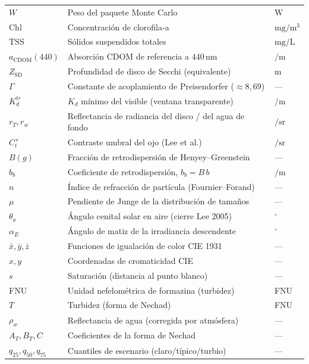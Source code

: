\documentclass[11pt,a4paper]{article}
\newcommand{\si}[1]{\ensuremath{#1}}
\newcommand{\SI}[2]{\ensuremath{#1\,#2}}
\newcommand{\watt}{\mathrm{W}}
\newcommand{\meter}{\mathrm{m}}
\newcommand{\gram}{\mathrm{g}}
\newcommand{\liter}{\mathrm{L}}
\newcommand{\steradian}{\mathrm{sr}}
\newcommand{\degree}{{}^{\circ}}
\newcommand{\per}{/}
\newcommand{\cubic}[1]{#1^{3}}
\newcommand{\milli}[1]{\mathrm{m}#1}
\newcommand{\nano}[1]{\mathrm{n}#1}
\begin{document}
\begin{longtable}{p{2.6cm}p{8.5cm}p{3cm}}
$W$ & Peso del paquete Monte Carlo & \si{\watt} \\
$\text{Chl}$ & Concentración de clorofila-a & \si{\milli\gram\per\cubic\meter} \\
$\text{TSS}$ & Sólidos suspendidos totales & \si{\milli\gram\per\liter} \\
$a_\text{CDOM}(440)$ & Absorción CDOM de referencia a \SI{440}{\nano\meter} & \si{\per\meter} \\
$Z_\text{SD}$ & Profundidad de disco de Secchi (equivalente) & \si{\meter} \\
$\Gamma$ & Constante de acoplamiento de Preisendorfer ($\approx 8{,}69$) & --- \\
$K_d^{tr}$ & $K_d$ mínimo del visible (ventana transparente) & \si{\per\meter} \\
$r_T, r_w$ & Reflectancia de radiancia del disco / del agua de fondo & \si{\per\steradian} \\
$C_t^{\,r}$ & Contraste umbral del ojo (Lee et al.) & \si{\per\steradian} \\
$B(g)$ & Fracción de retrodispersión de Henyey--Greenstein & --- \\
$b_b$ & Coeficiente de retrodispersión, $b_b=B\,b$ & \si{\per\meter} \\
$n$ & Índice de refracción de partícula (Fournier--Forand) & --- \\
$\mu$ & Pendiente de Junge de la distribución de tamaños & --- \\
$\theta_a$ & Ángulo cenital solar en aire (cierre Lee 2005) & \si{\degree} \\
$\alpha_E$ & Ángulo de matiz de la irradiancia descendente & \si{\degree} \\
$\bar x,\bar y,\bar z$ & Funciones de igualación de color CIE 1931 & --- \\
$x,y$ & Coordenadas de cromaticidad CIE & --- \\
$s$ & Saturación (distancia al punto blanco) & --- \\
FNU & Unidad nefelométrica de formazina (turbidez) & FNU \\
$T$ & Turbidez (forma de Nechad) & FNU \\
$\rho_w$ & Reflectancia de agua (corregida por atmósfera) & --- \\
$A_T, B_T, C$ & Coeficientes de la forma de Nechad & --- \\
$q_{25},q_{50},q_{75}$ & Cuantiles de escenario (claro/típico/turbio) & --- \\
\bottomrule
\end{longtable}
\end{document}
